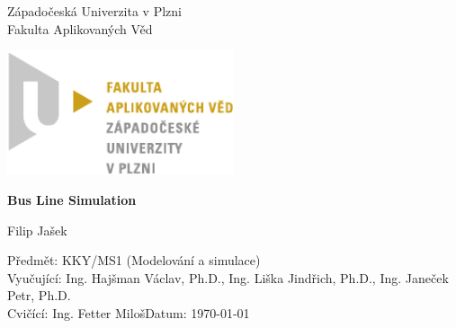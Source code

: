 \begin{titlepage}
    \begin{center}
        \LARGE
        Západočeská Univerzita v Plzni\\
        Fakulta Aplikovaných Věd\\
        
        \vspace{1cm}
        
        \includegraphics[width=0.5\textwidth]{./Graphics/FAV_logo.pdf}
        
        \vspace{4cm}
        
        \textbf{Bus Line Simulation}
        
        \vspace{0.5cm}
        Filip Jašek
        
    \end{center} 
    \vfill
        \noindent
        \large
        Předmět: KKY/MS1 (Modelování a simulace)\\
        Vyučující: Ing. Hajšman Václav, Ph.D., Ing. Liška Jindřich, Ph.D., Ing. Janeček Petr, Ph.D.\\
        Cvičící: Ing. Fetter Miloš\hfill Datum: \today
\end{titlepage}